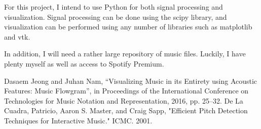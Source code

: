 \documentclass[12pt, a4paper]{article}
\begin{document}
For this project, I intend to use Python for both signal processing and
visualization. Signal processing can be done using the scipy library, and
visualization can be performed using any number of libraries such as
matplotlib and vtk.

In addition, I will need a rather large repository of music files. Luckily,
I have plenty myself as well as access to Spotify Premium.

\begin{thebibliography}{9}
 Dasaem Jeong and Juhan Nam, “Visualizing Music in its Entirety
using Acoustic Features: Music Flowgram”, in Proceedings of the International
Conference on Technologies for Music Notation and Representation, 2016, pp. 25–32.
 De La Cuadra, Patricio, Aaron S. Master, and Craig Sapp,
"Efficient Pitch Detection Techniques for Interactive Music." ICMC. 2001.
\end{thebibliography}
\end{document}
